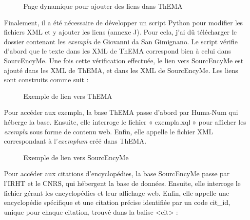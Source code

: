  \begin{figure}[H]
 	\centering
 	\caption{Page dynamique pour ajouter des liens dans ThEMA}
 \end{figure}

Finalement, il a été nécessaire de développer un script Python pour modifier les fichiers XML et y ajouter les liens (annexe J). Pour cela, j'ai dû télécharger le dossier contenant les \textit{exempla} de Giovanni da San Gimignano. Le script vérifie d'abord que le texte dans les XML de ThEMA correspond bien à celui dans SourcEncyMe. Une fois cette vérification effectuée, le lien vers SourcEncyMe est ajouté dans les XML de ThEMA, et dans les XML de SourcEncyMe. Les liens sont construits comme suit : \\

 \begin{figure}[H]
	\centering
	\caption{Exemple de lien vers ThEMA}
\end{figure}

Pour accéder aux exempla, la base ThEMA passe d'abord par Huma-Num qui héberge la base. Ensuite, elle interroge le fichier « exempla.xql » pour afficher les \textit{exempla} sous forme de contenu web. Enfin, elle appelle le fichier XML correspondant à l'\textit{exemplum} créé dans ThEMA. \\

\begin{figure}[H]
	\centering
	\caption{Exemple de lien vers SourcEncyMe}
\end{figure}

Pour accéder aux citations d'encyclopédies, la base SourcEncyMe passe par l'IRHT et le CNRS, qui hébergent la base de données. Ensuite, elle interroge le fichier gérant les encyclopédies et leur affichage web. Enfin, elle appelle une encyclopédie spécifique et une citation précise identifiée par un code cit\_id, unique pour chaque citation, trouvé dans la balise <cit> : \\

